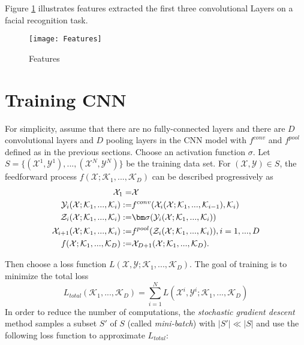 Figure \ref{ffea} illustrates features extracted the first three convolutional Layers  on a facial recognition task.

\begin{figure}[ht]
\label{ffea}
\centering
\texttt{[image: Features]}
\caption{Features}
\end{figure}

\section{Training CNN}
For simplicity, assume that there are no fully-connected layers and there are $D$ convolutional layers and $D$ pooling layers in the CNN model with $f^{conv}$ and $f^{pool}$ defined as in the previous sections. Choose an activation function $\sigma$. Let $S=\{(\mathcal{X}^1, \mathcal{Y}^1),...,(\mathcal{X}^N, \mathcal{Y}^N)\}$ be the training data set. For $(\mathcal{X}, \mathcal{Y})\in S$, the feedforward process $f(\mathcal{X};\mathcal{K}_1,...,\mathcal{K}_D)$ can be described progressively as
\begin{equation}
\aligned
\mathcal{X}_1 =& \mathcal{X}\\
\mathcal{Y}_{i}(\mathcal{X};\mathcal{K}_1,...,\mathcal{K}_i) :=& f^{conv}(\mathcal{X}_i(\mathcal{X};\mathcal{K}_1,...,\mathcal{K}_{i-1}), \mathcal{K}_i)\\
\mathcal{Z}_i(\mathcal{X};\mathcal{K}_1,...,\mathcal{K}_i) :=& \bm\sigma(\mathcal{Y}_{i}(\mathcal{X};\mathcal{K}_1,...,\mathcal{K}_i))\\
\mathcal{X}_{i+1}(\mathcal{X};\mathcal{K}_1,...,\mathcal{K}_i) :=& f^{pool}(\mathcal{Z}_i(\mathcal{X};\mathcal{K}_1,...,\mathcal{K}_i)), i=1,...,D\\
f(\mathcal{X};\mathcal{K}_1,...,\mathcal{K}_D):=&\mathcal{X}_{D+1}(\mathcal{X};\mathcal{K}_1,...,\mathcal{K}_D).
\endaligned
\end{equation}

Then choose a loss function $L(\mathcal{X},\mathcal{Y};\mathcal{K}_1,...,\mathcal{K}_D)$. The goal of training is to minimize the total loss 
\begin{equation}
L_{total}(\mathcal{K}_1,...,\mathcal{K}_D) = \sum_{i=1}^N L(\mathcal{X}^i,\mathcal{Y}^i;\mathcal{K}_1,...,\mathcal{K}_D)
\end{equation}
In order to reduce the number of computations, the \textit{stochastic gradient descent} method samples a subset $S'$ of $S$ (called \textit{mini-batch}) with $|S'|\ll |S|$ and use the following loss function to approximate $L_{total}$:

